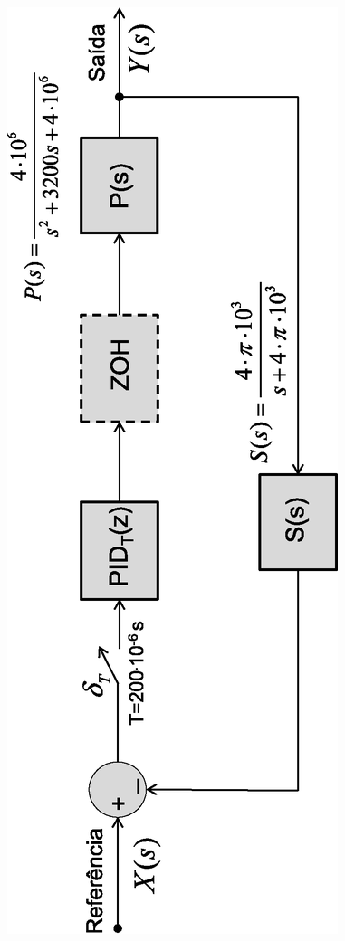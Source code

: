 \begin{figure}[!ht]
	\centering
	\includegraphics[scale = .5, angle =-90, frame]{Imagens/PID.eps}
	\caption{}
	\label{}
\end{figure}

